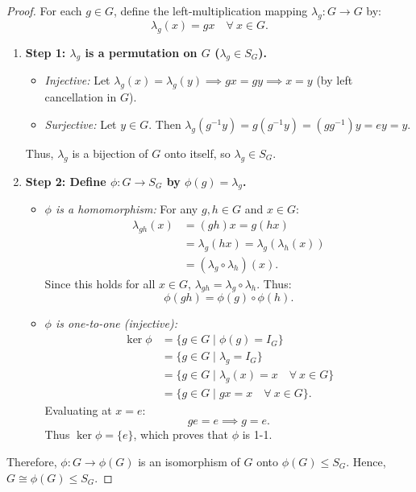 \documentclass[12pt]{article}
\theoremstyle{definition}
\theoremstyle{plain}
\begin{document}
\begin{proof}
For each $g \in G$, define the left-multiplication mapping $\lambda_g: G \longrightarrow G$ by:
\[
\lambda_g(x) = gx \quad \forall\ x \in G.
\]
\begin{enumerate}
    \item \textbf{Step 1: $\lambda_g$ is a permutation on $G$ ($\lambda_g \in S_G$).}
    \begin{itemize}
        \item \textit{Injective:} Let $\lambda_g(x) = \lambda_g(y) \implies gx = gy \implies x = y$ (by left cancellation in $G$).
        \item \textit{Surjective:} Let $y \in G$. Then $\lambda_g(g^{-1}y) = g(g^{-1}y) = (gg^{-1})y = ey = y$.
    \end{itemize}
    Thus, $\lambda_g$ is a bijection of $G$ onto itself, so $\lambda_g \in S_G$.

    \item \textbf{Step 2: Define $\phi: G \longrightarrow S_G$ by $\phi(g) = \lambda_g$.}
    \begin{itemize}
        \item \textit{$\phi$ is a homomorphism:}
        For any $g, h \in G$ and $x \in G$:
        \begin{align*}
            \lambda_{gh}(x) &= (gh)x = g(hx) \\
            &= \lambda_g(hx) = \lambda_g(\lambda_h(x)) \\
            &= (\lambda_g \circ \lambda_h)(x).
        \end{align*}
        Since this holds for all $x \in G$, $\lambda_{gh} = \lambda_g \circ \lambda_h$.
        Thus:
        \[
        \phi(gh) = \phi(g) \circ \phi(h).
        \]

        \item \textit{$\phi$ is one-to-one (injective):}
        \begin{align*}
            \ker \phi &= \{g \in G \mid \phi(g) = I_G\} \\
            &= \{g \in G \mid \lambda_g = I_G\} \\
            &= \{g \in G \mid \lambda_g(x) = x \quad \forall\ x \in G\} \\
            &= \{g \in G \mid gx = x \quad \forall\ x \in G\}.
        \end{align*}
        Evaluating at $x = e$:
        \[
        ge = e \implies g = e.
        \]
        Thus $\ker \phi = \{e\}$, which proves that $\phi$ is 1-1.
    \end{itemize}
\end{enumerate}
Therefore, $\phi: G \longrightarrow \phi(G)$ is an isomorphism of $G$ onto $\phi(G) \le S_G$.
Hence, $\boxed{G \cong \phi(G) \le S_G}$.
\end{proof}
\end{document}
